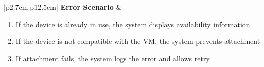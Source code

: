 \begin{table}[H]
\begin{tabular}{|p{2.7cm}|p{12.5cm}|}
            \hline
            \textbf{Error Scenario} & \begin{minipage}[t]{\linewidth}
                                          \begin{enumerate}[topsep=0pt,itemsep=1pt,parsep=0pt,partopsep=0pt]
                                              \item If the device is already in use, the system displays availability information
                                              \item If the device is not compatible with the VM, the system prevents attachment
                                              \item If attachment fails, the system logs the error and allows retry
                                          \end{enumerate}
                                      \end{minipage} \\
            \hline
        \end{tabular}
        \label{tab:eng-attach-device}
    \end{table}

